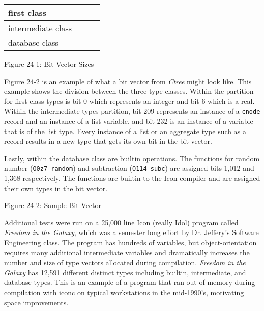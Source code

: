 \begin{center}
\tabletail{}
\tablelasttail{}
\begin{xtabular}{|m{1.2191598in}|m{1.1629599in}|m{1.2455599in}|m{1.6080599in}|}
\hline
 first class &
 &
 &
\raggedleft{}\\\hline
 intermediate class &
 &
 &
\raggedleft{}\\\hline
 database class &
 &
 &
\raggedleft{}\\\hline
\end{xtabular}
\end{center}
{\centering{}
Figure 24-1: Bit Vector Sizes
\par}


Figure 24-2 is an example of what a bit vector from \textit{Ctree}
might look like. This example shows the division between the three
type classes. Within the partition for first class types is bit 0
which represents an integer and bit 6 which is a real. Within the
intermediate types partition, bit 209 represents an instance of a
\texttt{cnode} record and an instance of a list variable, and bit 232
is an instance of a variable that is of the list type. Every instance
of a list or an aggregate type such as a record results in a new type
that gets its own bit in the bit vector.

Lastly, within the database class are builtin operations. The
functions for random number (\texttt{O0z7\_random}) and subtraction
(\texttt{O114\_subc}) are assigned bits 1,012 and 1,368
respectively. The functions are builtin to the Icon compiler and are
assigned their own types in the bit vector.

\bigskip

{\centering{}
Figure 24-2: Sample Bit Vector
\par}

Additional tests were run on a 25,000 line Icon (really Idol) program
called \textit{Freedom in the Galaxy}, which was a semester long
effort by Dr. Jeffery's Software Engineering class. The program has
hundreds of variables, but object-orientation requires many additional
intermediate variables and dramatically increases the number and
size of type vectors allocated during compilation. \textit{Freedom in
the Galaxy} has 12,591 different distinct types including builtin,
intermediate, and database types. This is an example of a program that
ran out of memory during compilation with iconc on typical
workstations in the mid-1990's, motivating space improvements.

